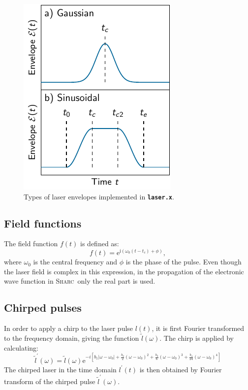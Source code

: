 \documentclass[a4paper,10pt,DIV=15,openany,twoside=false]{scrbook}
\newcommand{\sharc}{\textsc{Sharc}}
\newcommand{\ttt}[1]{\textbf{\texttt{#1}}}
\newcommand{\E}{\ensuremath{\mathrm{e}}}
\newcommand{\I}{\ensuremath{\mathrm{i}}}
\begin{document}
\begin{figure}[htb]
  \centering
  \includegraphics[scale=1]{img/laser_envelope/laser_envelope.pdf}
  \caption{Types of laser envelopes implemented in \ttt{laser.x}.}
  \label{fig:laser_envelope}
\end{figure}

\subsection{Field functions}

The field function $f(t)$ is defined as:
\begin{equation}
  f(t)=\E^{\I \left(\omega_0(t-t_c)+\phi\right)},
\end{equation}
where $\omega_0$ is the central frequency and $\phi$ is the phase of the pulse. Even though the laser field is complex in this expression, in the propagation of the electronic wave function in \sharc\ only the real part is used.

\subsection{Chirped pulses}

In order to apply a chirp to the laser pulse $l(t)$, it is first Fourier transformed to the frequency domain, giving the function $\tilde{l}(\omega)$. The chirp is applied by calculating:
\begin{equation}
  \tilde{l}^\prime(\omega)=
  \tilde{l}(\omega)
  \E^{-i\left[
  b_1|\omega-\omega_0|
  +\frac{b_2}{2}(\omega-\omega_0)^2
  +\frac{b_3}{6}(\omega-\omega_0)^3
  +\frac{b_4}{24}(\omega-\omega_0)^4
  \right]}\label{eq:laser_chirp}
\end{equation}
The chirped laser in the time domain $l^\prime(t)$ is then obtained by Fourier transform of the chirped pulse $\tilde{l}^\prime(\omega)$.
\end{document}
